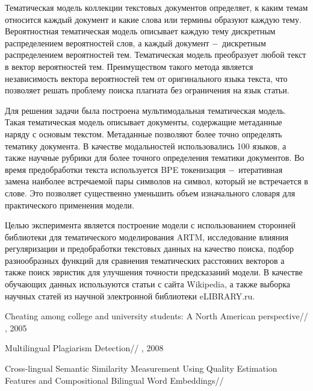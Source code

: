 \documentclass[12pt, twoside]{article}
\begin{document}
Тематическая модель коллекции текстовых документов определяет, к каким темам относится каждый документ и какие слова или термины образуют каждую тему. Вероятностная тематическая модель описывает каждую тему дискретным распределением вероятностей слов, а каждый документ $\--$ дискретным распределением вероятностей тем. Тематическая модель преобразует любой текст в вектор вероятностей тем. Преимуществом такого метода является независимость вектора вероятностей тем от оригинального языка текста, что позволяет решать проблему поиска плагиата без ограничения на язык статьи.

Для решения задачи была построена мультимодальная тематическая модель. Такая тематическая модель описывает документы, содержащие метаданные наряду с основым текстом. Метаданные позволяют более точно определять тематику документа. В качестве модальностей использовались 100 языков, а также научные рубрики для более точного определения тематики документов. Во время предобработки текста используется BPE токенизация $\--$ итеративная замена наиболее встречаемой пары символов на символ, который не встречается в слове. Это позволяет существенно уменьшить объем изначального словаря для практического применения модели.

Целью эксперимента является построение модели с использованием сторонней библиотеки для тематического моделирования ARTM, исследование влияния регуляризации и предобработки текстовых данных на качество поиска, подбор разнообразных функций для сравнения тематических расстояних векторов а также поиск эвристик для улучшения точности предсказаний модели. В качестве обучающих данных используются статьи с сайта Wikipedia, а также выборка научных статей из научной электронной библиотеки eLIBRARY.ru.



\begin{thebibliography}{3}

    Cheating among college and university students: A North American perspective//
    , 2005
    
    Multilingual Plagiarism Detection//
    , 2008
    
    Cross-lingual Semantic Similarity Measurement Using Quality Estimation Features and Compositional Bilingual Word Embeddings//

	  
\end{thebibliography}
\end{document}
